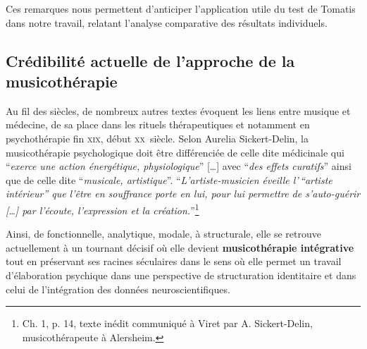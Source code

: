 Ces remarques nous permettent d'anticiper
l'application utile du test de Tomatis dans notre travail, relatant l'analyse
comparative des résultats individuels.


\subsection{Crédibilité actuelle de l'approche de la musicothérapie }


Au fil des siècles, de nombreux autres
textes évoquent les liens entre musique et médecine, de sa place dans les
rituels thérapeutiques et notamment en psychothérapie fin \textsc{xix}\ieme,
début \textsc{xx}\ieme\ siècle.
Selon Aurelia Sickert-Delin, la musicothérapie
psychologique doit être différenciée de celle dite médicinale qui
\enquote{\emph{exerce une action
énergétique, physiologique}} [\dots] avec \enquote{\emph{des effets curatifs}}
ainsi que de celle dite \enquote{\emph{musicale, artistique}}.
\enquote{\emph{L'artiste-musicien éveille l'\,``artiste intérieur'' que l'être
en souffrance porte en lui, pour lui permettre de s'auto-guérir [\dots] par
l'écoute, l'expression et la création.}}\autocite {viret:b}\footnote{ Ch. 1,  p. 14,
texte
inédit communiqué à Viret par A. Sickert-Delin, musicothérapeute à Alersheim.}

 Ainsi, de fonctionnelle, analytique, mo\-da\-le,  à
struc\-tu\-rale, elle se retrouve actuellement
 à un tournant décisif où elle devient
 \textbf{ musicothérapie intégrative} tout en préservant ses racines
 séculaires dans le sens où elle permet un travail d'élaboration psychique dans une perspective de structuration identitaire \autocite[ch. III, p. 53,
105]{vrait_musicotherapie_2018} et dans celui de l'intégration des données
neuroscientifiques.






